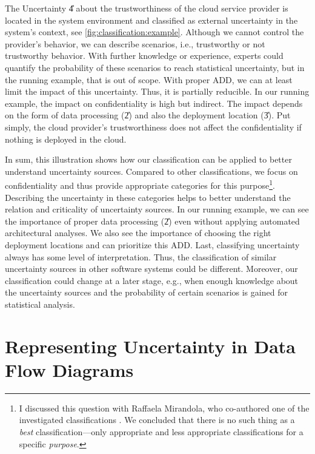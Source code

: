 The Uncertainty \U{4} about the trustworthiness of the cloud service provider is located in the system environment and classified as external uncertainty in the system's context, see \autoref{fig:classification:example}.
Although we cannot control the provider's behavior, we can describe scenarios, i.e., trustworthy or not trustworthy behavior.
With further knowledge or experience, experts could quantify the probability of these scenarios to reach statistical uncertainty, but in the running example, that is out of scope.
With proper \ac{ADD}, we can at least limit the impact of this uncertainty.
Thus, it is partially reducible.
In our running example, the impact on confidentiality is high but indirect.
The impact depends on the form of data processing (\U{2}) and also the deployment location (\U{3}).
Put simply, the cloud provider's trustworthiness does not affect the confidentiality if nothing is deployed in the cloud.

In sum, this illustration shows how our classification can be applied to better understand uncertainty sources.
Compared to other classifications, we focus on confidentiality and thus provide appropriate categories for this purpose\footnote{I discussed this question with Raffaela Mirandola, who co-authored one of the investigated classifications \cite{perez-palacin_uncertainties_2014}. We concluded that there is no such thing as a \emph{best} classification---only appropriate and less appropriate classifications for a specific \emph{purpose}.}.
Describing the uncertainty in these categories helps to better understand the relation and criticality of uncertainty sources.
In our running example, we can see the importance of proper data processing (\U{2}) even without applying automated architectural analyses.
We also see the importance of choosing the right deployment locations and can prioritize this \ac{ADD}.
Last, classifying uncertainty always has some level of interpretation.
Thus, the classification of similar uncertainty sources in other software systems could be different.
Moreover, our classification could change at a later stage, e.g., when enough knowledge about the uncertainty sources and the probability of certain scenarios is gained for statistical analysis.





\section{Representing Uncertainty in Data Flow Diagrams}%
\label{sec:classification:dfd}

